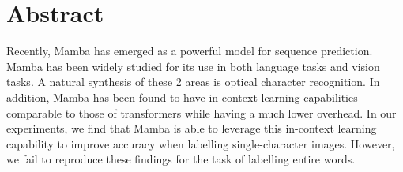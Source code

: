 \section{Abstract}
Recently, Mamba has emerged as a powerful model for sequence prediction.
Mamba has been widely studied for its use in both language
tasks\cite{mamba,mambalang} and vision tasks\cite{medmamba,vmamba}.
A natural synthesis of these 2 areas is optical character recognition.
In addition, Mamba has been found to have in-context learning capabilities
comparable to those of transformers while having a much lower
overhead\cite{mambaicl}.
In our experiments, we find that Mamba is able to leverage this in-context
learning capability to improve accuracy when labelling single-character images.
However, we fail to reproduce these findings for the task of labelling entire
words.
